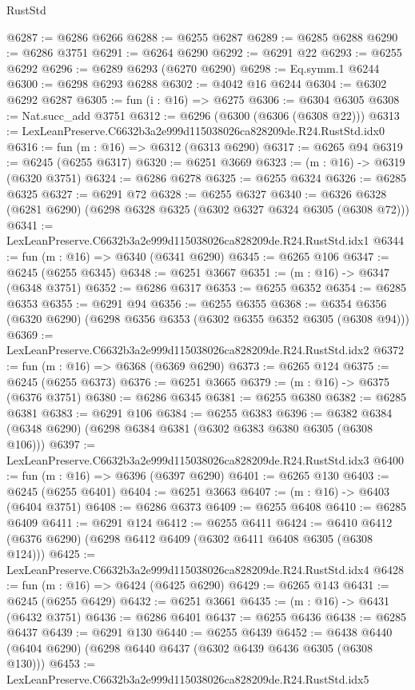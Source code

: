 \begin{lexlean}{RustStd}
\begin{coremodule}
@6287 := @6286 @6266
@6288 := @6255 @6287
@6289 := @6285 @6288
@6290 := @6286 @3751
@6291 := @6264 @6290
@6292 := @6291 @22
@6293 := @6255 @6292
@6296 := @6289 @6293 (@6270 @6290)
@6298 := Eq.symm.{1} @6244
@6300 := @6298 @6293 @6288
@6302 := @4042 @16 @6244
@6304 := @6302 @6292 @6287
@6305 := fun (i : @16) => @6275
@6306 := @6304 @6305
@6308 := Nat.succ_add @3751
@6312 := @6296 (@6300 (@6306 (@6308 @22)))
@6313 := LexLeanPreserve.C6632b3a2e999d115038026ca828209de.R24.RustStd.idx0
@6316 := fun (m : @16) => @6312 (@6313 @6290)
@6317 := @6265 @94
@6319 := @6245 (@6255 @6317)
@6320 := @6251 @3669
@6323 := (m : @16) -> @6319 (@6320 @3751)
@6324 := @6286 @6278
@6325 := @6255 @6324
@6326 := @6285 @6325
@6327 := @6291 @72
@6328 := @6255 @6327
@6340 := @6326 @6328 (@6281 @6290) (@6298 @6328 @6325 (@6302 @6327 @6324 @6305 (@6308 @72)))
@6341 := LexLeanPreserve.C6632b3a2e999d115038026ca828209de.R24.RustStd.idx1
@6344 := fun (m : @16) => @6340 (@6341 @6290)
@6345 := @6265 @106
@6347 := @6245 (@6255 @6345)
@6348 := @6251 @3667
@6351 := (m : @16) -> @6347 (@6348 @3751)
@6352 := @6286 @6317
@6353 := @6255 @6352
@6354 := @6285 @6353
@6355 := @6291 @94
@6356 := @6255 @6355
@6368 := @6354 @6356 (@6320 @6290) (@6298 @6356 @6353 (@6302 @6355 @6352 @6305 (@6308 @94)))
@6369 := LexLeanPreserve.C6632b3a2e999d115038026ca828209de.R24.RustStd.idx2
@6372 := fun (m : @16) => @6368 (@6369 @6290)
@6373 := @6265 @124
@6375 := @6245 (@6255 @6373)
@6376 := @6251 @3665
@6379 := (m : @16) -> @6375 (@6376 @3751)
@6380 := @6286 @6345
@6381 := @6255 @6380
@6382 := @6285 @6381
@6383 := @6291 @106
@6384 := @6255 @6383
@6396 := @6382 @6384 (@6348 @6290) (@6298 @6384 @6381 (@6302 @6383 @6380 @6305 (@6308 @106)))
@6397 := LexLeanPreserve.C6632b3a2e999d115038026ca828209de.R24.RustStd.idx3
@6400 := fun (m : @16) => @6396 (@6397 @6290)
@6401 := @6265 @130
@6403 := @6245 (@6255 @6401)
@6404 := @6251 @3663
@6407 := (m : @16) -> @6403 (@6404 @3751)
@6408 := @6286 @6373
@6409 := @6255 @6408
@6410 := @6285 @6409
@6411 := @6291 @124
@6412 := @6255 @6411
@6424 := @6410 @6412 (@6376 @6290) (@6298 @6412 @6409 (@6302 @6411 @6408 @6305 (@6308 @124)))
@6425 := LexLeanPreserve.C6632b3a2e999d115038026ca828209de.R24.RustStd.idx4
@6428 := fun (m : @16) => @6424 (@6425 @6290)
@6429 := @6265 @143
@6431 := @6245 (@6255 @6429)
@6432 := @6251 @3661
@6435 := (m : @16) -> @6431 (@6432 @3751)
@6436 := @6286 @6401
@6437 := @6255 @6436
@6438 := @6285 @6437
@6439 := @6291 @130
@6440 := @6255 @6439
@6452 := @6438 @6440 (@6404 @6290) (@6298 @6440 @6437 (@6302 @6439 @6436 @6305 (@6308 @130)))
@6453 := LexLeanPreserve.C6632b3a2e999d115038026ca828209de.R24.RustStd.idx5

\end{coremodule}
\end{lexlean}
